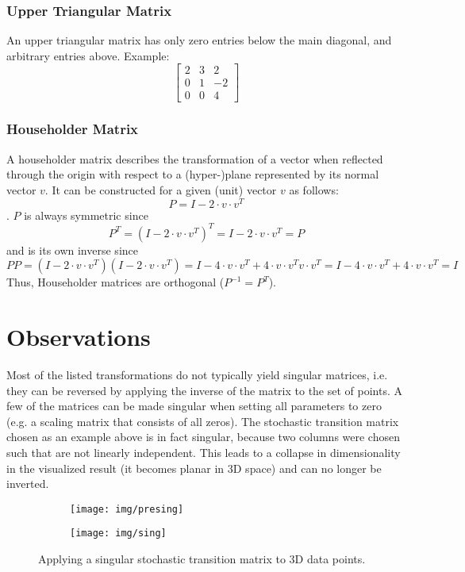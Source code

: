 \documentclass{scrartcl}
\begin{document}
\subsubsection*{Upper Triangular Matrix}
An upper triangular matrix has only zero entries below the main diagonal, and arbitrary entries above. Example:
$$\left[ \begin{smallmatrix} 
2 & 3 & 2\\
0 & 1 & -2\\
0 & 0 & 4
\end{smallmatrix} \right]$$

\subsubsection*{Householder Matrix}
A householder matrix describes the transformation of a vector when reflected through the origin with respect to a (hyper-)plane represented by its normal vector $v$.
It can be constructed for a given (unit) vector $v$ as follows:
$$P = I - 2 \cdot v \cdot v^T$$. 
$P$ is always symmetric since $$P^T = (I- 2 \cdot v \cdot v^T)^T = I- 2 \cdot v \cdot v^T = P$$ and is its own inverse since $$PP = (I- 2 \cdot v \cdot v^T)(I- 2 \cdot v \cdot v^T) = I - 4 \cdot v \cdot v^T + 4 \cdot v \cdot v^T  v \cdot v^T = I - 4 \cdot v \cdot v^T + 4 \cdot v \cdot v^T = I$$
Thus, Householder matrices are orthogonal ($P^{-1} = P^T$).

\section{Observations}
Most of the listed transformations do not typically yield singular matrices, i.e. they can be reversed by applying the inverse of the matrix to the set of points. A few of the matrices can be made singular when setting all parameters to zero (e.g. a scaling matrix that consists of all zeros).
The stochastic transition matrix chosen as an example above is in fact singular, because two columns were chosen such that are not linearly independent. This leads to a collapse in dimensionality in the visualized result (it becomes planar in 3D space) and can no longer be inverted.

\begin{figure}[H]
	\centering
	\begin{subfigure}{.41\textwidth}
		\centering
		\texttt{[image: img/presing]}
	\end{subfigure}%
	\begin{subfigure}{.41\textwidth}
		\centering
		\texttt{[image: img/sing]}
	\end{subfigure}
	\caption{Applying a singular stochastic transition matrix to 3D data points.}
	\label{fig:rot}
\end{figure}
\end{document}
